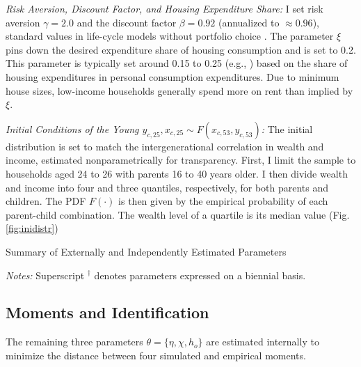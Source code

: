 \documentclass[12pt]{article}
\begin{document}

\textit{Risk Aversion, Discount Factor, and Housing Expenditure Share:} I set risk aversion $\gamma=2.0$ and the discount factor $\beta=0.92$ (annualized to $\approx0.96$), standard values in life-cycle models without portfolio choice \citep[see e.g.,][]{Kaplan2020,Boar2018}. The parameter $\xi$ pins down the desired expenditure share of housing consumption and is set to 0.2. This parameter is typically set around 0.15 to 0.25 (e.g., \citealp{Kaplan2020,Chatterjee2015,Paz-Pardo2019,davis2011household}) based on the share of housing expenditures in personal consumption expenditures. Due to minimum house sizes, low-income households generally spend more on rent than implied by $\xi$.


\textit{Initial Conditions of the Young $y_{c,25},x_{c,25}\sim F(x_{c,53},y_{c,53})$:} 
The initial distribution is set to match the intergenerational correlation in wealth and income, estimated nonparametrically for transparency. First, I limit the sample to households aged 24 to 26 with parents 16 to 40 years older. I then divide wealth and income into four and three quantiles, respectively, for both parents and children. The PDF $F(\cdot)$ is then given by the empirical probability of each parent-child combination. The wealth level of a quartile is its median value (Fig. \ref{fig:inidistr})

 
\begin{table}
	\center
	\begin{threeparttable}
		\caption{Summary of Externally and Independently Estimated Parameters}\label{tab:calpar}
		\small
		
		\footnotesize
		\textit{Notes:} Superscript $^\dagger$ denotes parameters expressed on a biennial basis.
	\end{threeparttable}
\end{table}


\subsection{Moments and Identification}
The remaining three parameters $\theta=\{\eta,\chi,h_o\}$ are estimated internally to minimize the distance between four simulated and empirical moments. 
\end{document}
